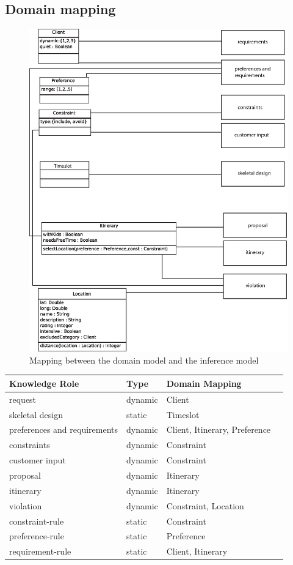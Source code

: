 \documentclass[11pt]{article} %
\begin{document}
\subsection{Domain mapping}
\begin{figure}[H]
\centering
\includegraphics[width=\textwidth]{images/dom_VS_inference.eps}
\caption{Mapping between the domain model and the inference model}
\label{fig:MappingDomainInference}
\end{figure}
\noindent
\begin{tabularx}{\textwidth}{| X | X | X | X |}
\hline 
\textbf{Knowledge Role} & \textbf{Type} & \textbf{Domain Mapping}
\\ \hline \hline
request    &   dynamic  & Client
\\ \hline
skeletal design  & static    & Timeslot
\\ \hline
preferences and requirements  & dynamic    & Client, Itinerary, Preference
\\ \hline
constraints  & dynamic    & Constraint
\\ \hline
customer input  & dynamic    & Constraint
\\ \hline
proposal  & dynamic    & Itinerary
\\ \hline
itinerary  & dynamic    & Itinerary
\\ \hline
violation  & dynamic    & Constraint, Location %
\\ \hline
constraint-rule  & static    & Constraint
\\ \hline
preference-rule  & static    & Preference
\\ \hline
requirement-rule  & static    & Client, Itinerary
\\ \hline
\end{tabularx}
\end{document}
